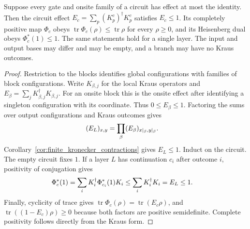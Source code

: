 \begin{theorem}
    \label{thm:circuits_tni}
    \leanok
    Suppose every gate and onsite family of a circuit has effect at most the
    identity. Then the circuit effect $E_c=\sum_p(K_p^c)^\dagger K_p^c$ satisfies
    $E_c\le1$. Its completely positive map $\Phi_c$ obeys
    $\operatorname{tr}\Phi_c(\rho)\le\operatorname{tr}\rho$ for every $\rho\ge0$,
    and its Heisenberg dual obeys $\Phi_c^*(1)\le1$.
    The same statements hold for a single layer. The input and output bases may
    differ and may be empty, and a branch may have no Kraus outcomes.
\end{theorem}
\begin{proof}\leanok
    Restriction to the blocks identifies global configurations with families
    of block configurations. Write $K_{\beta,j}$ for the local Kraus operators
    and $E_\beta=\sum_jK_{\beta,j}^\dagger K_{\beta,j}$. For an onsite block this
    is the onsite effect after identifying a singleton configuration with its
    coordinate. Thus $0\le E_\beta\le1$. Factoring the sums over output
    configurations and Kraus outcomes gives
    \begin{align}
        (E_L)_{x,y}
        &=\prod_\beta (E_\beta)_{x|_\beta,y|_\beta}.
        \notag
    \end{align}
    Corollary~\ref{cor:finite_kronecker_contractions} gives $E_L\le1$.
    Induct on the circuit. The empty circuit fixes $1$. If a layer $L$ has
    continuation $c_i$ after outcome $i$, positivity of conjugation gives
    \begin{align}
        \Phi_c^*(1)
        &=\sum_iK_i^\dagger\Phi_{c_i}^*(1)K_i
        \le\sum_iK_i^\dagger K_i=E_L\le1.
        \notag
    \end{align}
    Finally, cyclicity of trace gives
    $\operatorname{tr}\Phi_c(\rho)=\operatorname{tr}(E_c\rho)$, and
    $\operatorname{tr}((1-E_c)\rho)\ge0$ because both factors are positive
    semidefinite. Complete positivity follows directly from the Kraus form.
\end{proof}

